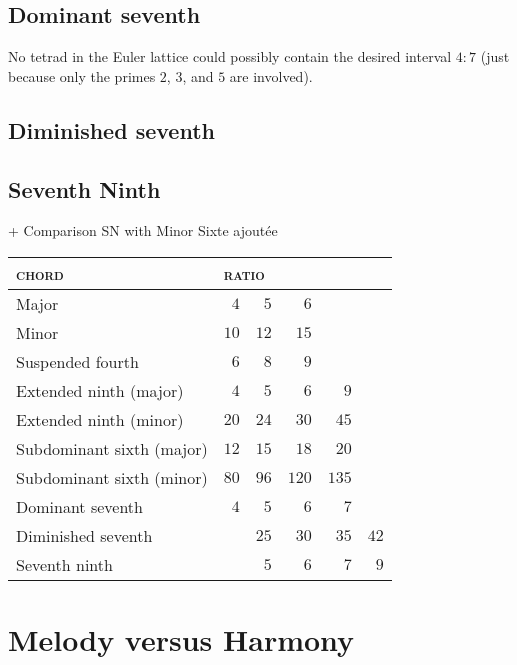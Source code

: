 \documentclass[british,11pt]{scrartcl}
\begin{document}
\subsection{Dominant seventh}


No tetrad in the Euler lattice could possibly contain the
desired interval $4:7$ (just because only the primes $2$, $3$, and $5$ are
involved).


\subsection{Diminished seventh}


\subsection{Seventh Ninth}

+ Comparison SN with Minor Sixte ajoutée

\begin{table}
  \centering
  \begin{tabular}{lrrrrr}
    \toprule
    \textsc{chord} & \multicolumn{4}{l}{\textsc{ratio}}\\
    \midrule
    Major                     & $4$  & $5$  & $6$\\
    Minor                     & $10$ & $12$ & $15$\\
    Suspended fourth          & $6$  & $8$  & $9$\\
    Extended ninth (major)    & $4$  & $5$  & $6$  & $9$\\
    Extended ninth (minor)    & $20$ & $24$ & $30$ & $45$\\
    Subdominant sixth (major) & $12$ & $15$ & $18$ & $20$\\
    Subdominant sixth (minor) & $80$ & $96$ & $120$ & $135$\\
    Dominant seventh          & $4$  & $5$  & $6$  & $7$\\
    Diminished seventh        &      & $25$ & $30$ & $35$ & $42$\\
    Seventh ninth             &      & $5$  & $6$  & $7$  & $9$\\
    \bottomrule
  \end{tabular}
\end{table}

\section{Melody versus Harmony}
\end{document}
